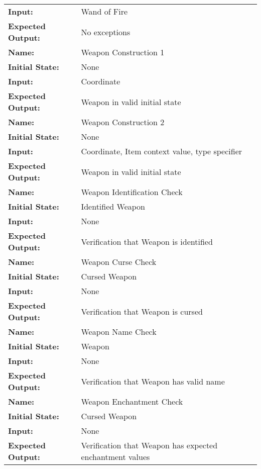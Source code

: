 \documentclass[12pt, titlepage]{article}
\begin{document}
\begin{center}
\begin{longtable}{ l | p{10cm} }
				\textbf{Input:} & Wand of Fire\\
				\textbf{Expected Output:} & No exceptions\\[0.6em]
				\hline
				\rule{0pt}{1.5em}\textbf{Name:} & Weapon Construction 1\\
				\textbf{Initial State:} & None\\
				\textbf{Input:} & Coordinate\\
				\textbf{Expected Output:} & Weapon in valid initial state\\[0.6em]
				\hline
				\rule{0pt}{1.5em}\textbf{Name:} & Weapon Construction 2\\
				\textbf{Initial State:} & None\\
				\textbf{Input:} & Coordinate, Item context value, type specifier\\
				\textbf{Expected Output:} & Weapon in valid initial state\\[0.6em]
				\hline
				\rule{0pt}{1.5em}\textbf{Name:} & Weapon Identification Check\\
				\textbf{Initial State:} & Identified Weapon\\
				\textbf{Input:} & None\\
				\textbf{Expected Output:} & Verification that Weapon is identified\\[0.6em]
				\hline
				\rule{0pt}{1.5em}\textbf{Name:} & Weapon Curse Check\\
				\textbf{Initial State:} & Cursed Weapon\\
				\textbf{Input:} & None\\
				\textbf{Expected Output:} & Verification that Weapon is cursed\\[0.6em]
				\hline
				\rule{0pt}{1.5em}\textbf{Name:} & Weapon Name Check\\
				\textbf{Initial State:} & Weapon\\
				\textbf{Input:} & None\\
				\textbf{Expected Output:} & Verification that Weapon has valid name\\[0.6em]
				\hline
				\rule{0pt}{1.5em}\textbf{Name:} & Weapon Enchantment Check\\
				\textbf{Initial State:} & Cursed Weapon\\
				\textbf{Input:} & None\\
				\textbf{Expected Output:} & Verification that Weapon has expected enchantment values\\[0.6em]
				\hline

			\end{longtable}

		\end{center}
\end{document}
